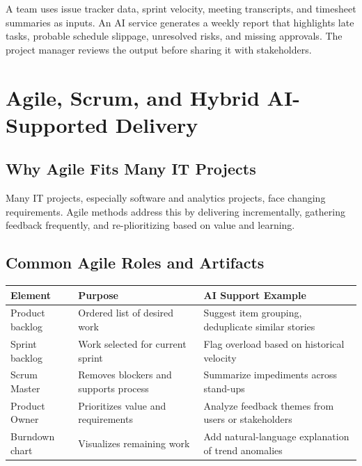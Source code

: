 \documentclass[11pt,a4paper]{article}
\begin{document}
\begin{examplebox}
A team uses issue tracker data, sprint velocity, meeting transcripts, and timesheet summaries as inputs. An AI service generates a weekly report that highlights late tasks, probable schedule slippage, unresolved risks, and missing approvals. The project manager reviews the output before sharing it with stakeholders.
\end{examplebox}

\section{Agile, Scrum, and Hybrid AI-Supported Delivery}

\subsection{Why Agile Fits Many IT Projects}

\begin{conceptbox}
Many IT projects, especially software and analytics projects, face changing requirements. Agile methods address this by delivering incrementally, gathering feedback frequently, and re-plioritizing based on value and learning.
\end{conceptbox}

\subsection{Common Agile Roles and Artifacts}

\begin{longtable}{p{2.8cm}p{3.7cm}p{5.0cm}}
\toprule
\textbf{Element} & \textbf{Purpose} & \textbf{AI Support Example} \\
\midrule
Product backlog & Ordered list of desired work & Suggest item grouping, deduplicate similar stories \\
Sprint backlog & Work selected for current sprint & Flag overload based on historical velocity \\
Scrum Master & Removes blockers and supports process & Summarize impediments across stand-ups \\
Product Owner & Prioritizes value and requirements & Analyze feedback themes from users or stakeholders \\
Burndown chart & Visualizes remaining work & Add natural-language explanation of trend anomalies \\
\bottomrule
\end{longtable}
\end{document}
